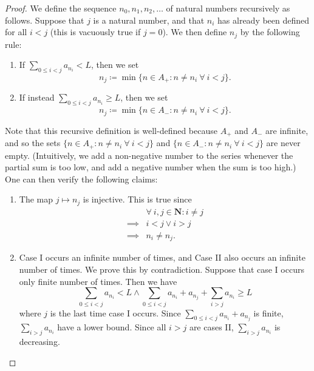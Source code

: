 \begin{proof}
    We define the sequence \(n_0, n_1, n_2, \dots\) of natural numbers recursively as follows.
    Suppose that \(j\) is a natural number, and that \(n_i\) has already been defined for all \(i < j\) (this is vacuously true if \(j = 0\)).
    We then define \(n_j\) by the following rule:
    \begin{enumerate}[label=(\Roman*)]
        \item If \(\sum_{0 \leq i < j} a_{n_i} < L\), then we set
              \[
                  n_j \coloneqq \min\{n \in A_+ : n \neq n_i \ \forall\ i < j\}.
              \]
        \item If instead \(\sum_{0 \leq i < j} a_{n_i} \geq L\), then we set
              \[
                  n_j \coloneqq \min\{n \in A_- : n \neq n_i \ \forall\ i < j\}.
              \]
    \end{enumerate}
    Note that this recursive definition is well-defined because \(A_+\) and \(A_-\) are infinite, and so the sets \(\{n \in A_+ : n \neq n_i \ \forall\ i < j\}\) and \(\{n \in A_- : n \neq n_i \ \forall\ i < j\}\) are never empty.
    (Intuitively, we add a non-negative number to the series whenever the partial sum is too low, and add a negative number when the sum is too high.)
    One can then verify the following claims:
    \begin{enumerate}
        \item The map \(j \mapsto n_j\) is injective.
              This is true since
              \begin{align*}
                           & \forall\ i, j \in \mathbf{N} : i \neq j \\
                  \implies & i < j \lor i > j                        \\
                  \implies & n_i \neq n_j.
              \end{align*}
        \item Case I occurs an infinite number of times, and Case II also occurs an infinite number of times.
              We prove this by contradiction.
              Suppose that case I occurs only finite number of times.
              Then we have
              \[
                  \sum_{0 \leq i < j} a_{n_i} < L \land \sum_{0 \leq i < j} a_{n_i} + a_{n_j} + \sum_{i > j} a_{n_i} \geq L
              \]
              where \(j\) is the last time case I occurs.
              Since \(\sum_{0 \leq i < j} a_{n_i} + a_{n_j}\) is finite, \(\sum_{i > j} a_{n_i}\) have a lower bound.
              Since all \(i > j\) are cases II, \(\sum_{i > j} a_{n_i}\) is decreasing.

\end{enumerate}
\end{proof}
